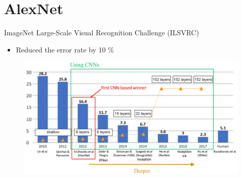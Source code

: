 \documentclass[serif, aspectratio=169]{beamer}
\begin{document}
\section{AlexNet}
\begin{frame}{ImageNet Large-Scale Visual Recognition Challenge (ILSVRC)}
	\begin{itemize}
		\item Reduced the error rate by 10 \%
	\end{itemize}
	\begin{figure}[htpb]
		\begin{center}
			\includegraphics[keepaspectratio, scale=0.25]{pic/imagenet}
		\end{center}
	\end{figure}
\end{frame}
\end{document}

